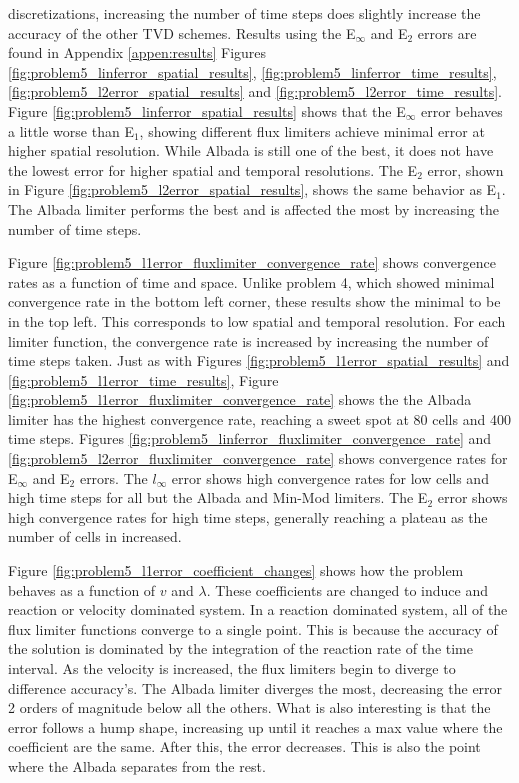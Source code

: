 \noindent discretizations, increasing the number of time steps does slightly increase the accuracy of the other TVD schemes. Results using the E${}_{\infty}$ and E${}_{2}$ errors are found in Appendix \ref{appen:results} Figures \ref{fig:problem5_linferror_spatial_results}, \ref{fig:problem5_linferror_time_results}, \ref{fig:problem5_l2error_spatial_results} and \ref{fig:problem5_l2error_time_results}. Figure \ref{fig:problem5_linferror_spatial_results} shows that the E${}_{\infty}$ error behaves a little worse than E${}_{1}$, showing different flux limiters achieve minimal error at higher spatial resolution. While Albada is still one of the best, it does not have the lowest error for higher spatial and temporal resolutions. The E${}_{2}$ error, shown in Figure \ref{fig:problem5_l2error_spatial_results}, shows the same behavior as E${}_{1}$. The Albada limiter performs the best and is affected the most by increasing the number of time steps.  

Figure \ref{fig:problem5_l1error_fluxlimiter_convergence_rate} shows convergence rates as a function of time and space. Unlike problem 4, which showed minimal convergence rate in the bottom left corner, these results show the minimal to be in the top left. This corresponds to low spatial and temporal resolution. For each limiter function, the convergence rate is increased by increasing the number of time steps taken. Just as with Figures \ref{fig:problem5_l1error_spatial_results} and \ref{fig:problem5_l1error_time_results}, Figure \ref{fig:problem5_l1error_fluxlimiter_convergence_rate} shows the the Albada limiter has the highest convergence rate, reaching a sweet spot at 80 cells and 400 time steps. Figures \ref{fig:problem5_linferror_fluxlimiter_convergence_rate} and \ref{fig:problem5_l2error_fluxlimiter_convergence_rate} shows convergence rates for E${}_{\infty}$ and E${}_{2}$ errors. The $l_{\infty}$ error shows high convergence rates for low cells and high time steps for all but the Albada and Min-Mod limiters. The E${}_{2}$ error shows high convergence rates for high time steps, generally reaching a plateau as the number of cells in increased.

Figure \ref{fig:problem5_l1error_coefficient_changes} shows how the problem behaves as a function of $v$ and $\lambda$. These coefficients are changed to induce and reaction or velocity dominated system. In a reaction dominated system, all of the flux limiter functions converge to a single point. This is because the accuracy of the solution is dominated by the integration of the reaction rate of the time interval. As the velocity is increased, the flux limiters begin to diverge to difference accuracy's. The Albada limiter diverges the most, decreasing the error 2 orders of magnitude below all the others. What is also interesting is that the error follows a hump shape, increasing up until it reaches a max value where the coefficient are the same. After this, the error decreases. This is also the point where the Albada separates from the rest. 

